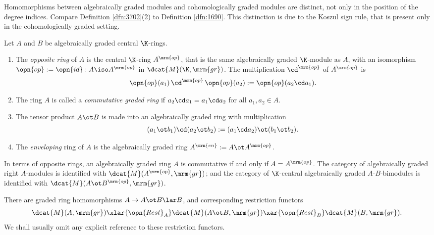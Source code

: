 \begin{rem} \label{rem:3900}
Homomorphisms between algebraically graded modules and cohomologically graded 
modules are distinct, not only in the position of the degree indices. 
Compare Definition \ref{dfn:3702}(2) to Definition \ref{dfn:1690}. 
This distinction is due to the Koszul sign rule, that is present only in the 
cohomologically graded setting. 
\end{rem}

\begin{dfn}  \label{dfn:3738}
Let $A$ and $B$ be algebraically graded central $\K$-rings. 
\begin{enumerate}
\item The {\em opposite ring} of $A$ is the central $\K$-ring 
$A^{\mrm{op}}$, that is the same algebraically graded $\K$-module as $A$, with 
an isomorphism
$\opn{op} := \opn{id} : A \iso A^{\mrm{op}}$
in $\dcat{M}(\K, \mrm{gr})$. The multiplication $\cd^{\mrm{op}}$ of 
$A^{\mrm{op}}$ is 
\[ \opn{op}(a_1) \, \cd^{\mrm{op}} \, \opn{op}(a_2) := \opn{op}(a_2 \cd a_1) . 
\]

\item The ring $A$ is called a {\em commutative graded ring} 
if  $a_2 \cd a_1 = a_1 \cd a_2$ for all $a_1, a_2 \in A$. 

\item The tensor product $A \ot B$ is made into an algebraically graded ring 
with multiplication 
\[ (a_1 \ot b_1) \cd (a_2 \ot b_2) :=  
(a_1 \cd a_2) \ot (b_1 \ot b_2)  . \]

\item The {\em enveloping} ring of $A$ is the  algebraically graded ring 
$A^{\mrm{en}} := A \ot A^{\mrm{op}}$.
\end{enumerate}
\end{dfn}

In terms of opposite rings, an algebraically graded ring $A$ is commutative if 
and only if $A = A^{\mrm{op}}$. 
The category of algebraically graded right $A$-modules is identified with  
$\dcat{M}(A^{\mrm{op}}, \mrm{gr})$; 
and the category of $\K$-central algebraically graded $A$-$B$-bimodules is  
identified with $\dcat{M}(A \ot B^{\mrm{op}}, \mrm{gr})$. 

There are graded ring homomorphisms 
$A \to A \ot B \lar B$,
and corresponding restriction functors 
\begin{equation} \label{eqn:3740}
\dcat{M}(A, \mrm{gr}) \xlar{\opn{Rest}_A}
\dcat{M}(A \ot B, \mrm{gr}) \xar{\opn{Rest}_B}
\dcat{M}(B, \mrm{gr})  . 
\end{equation}
We shall usually omit any explicit reference to these restriction 
functors.

